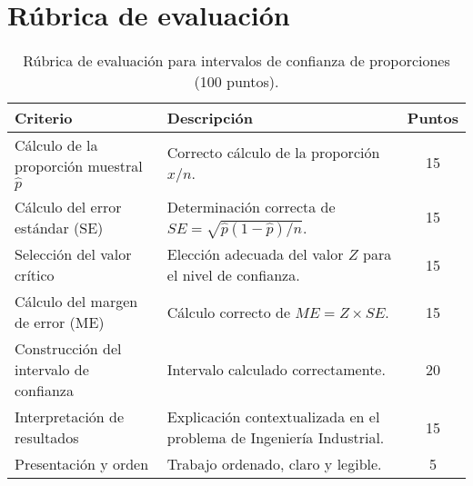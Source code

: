 
\section{Rúbrica de evaluación}

\begin{table}[H]
\centering
\begin{tabular}{p{} p{} c}
\toprule
\textbf{Criterio} & \textbf{Descripción} & \textbf{Puntos}\\
\midrule
Cálculo de la proporción muestral $\hat{p}$
& Correcto cálculo de la proporción $x/n$. & 15\\
Cálculo del error estándar (SE)
& Determinación correcta de $SE = \sqrt{\hat{p}(1-\hat{p})/n}$. & 15\\
Selección del valor crítico
& Elección adecuada del valor $Z$ para el nivel de confianza. & 15\\
Cálculo del margen de error (ME)
& Cálculo correcto de $ME = Z \times SE$. & 15\\
Construcción del intervalo de confianza
& Intervalo calculado correctamente. & 20\\
Interpretación de resultados
& Explicación contextualizada en el problema de Ingeniería Industrial. & 15\\
Presentación y orden
& Trabajo ordenado, claro y legible. & 5\\
\bottomrule
\end{tabular}
\caption{Rúbrica de evaluación para intervalos de confianza de proporciones (100 puntos).}
\end{table}